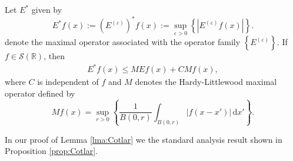 \documentclass[../dissertation.tex]{subfiles}
\begin{document}





\begin{lma}
	\label{lma:Cotlar}
	Let $E^*$ given by
	\[
		E^*f(x)
				:= \left( E^{(\varepsilon)} \right)^* f(x)
				:= \sup_{\varepsilon>0} \left\{\left|E^{(\varepsilon)} f(x)\right|\right\}.
	\]
	denote the maximal operator associated with the operator family 
	$\left\{ E^{(\varepsilon)}\right\}$. If $f \in \mathscr S(\mathbb R)$, then 
	\begin{align} \label{eq:Cotlar}
		E^* f(x) \leq M E f(x) + C M f(x),
	\end{align}
	where $C$ is independent of $f$ and $M$\label{sym:hardy} denotes the 
	Hardy-Littlewood maximal operator
	defined by 
	\[
        M f(x) 
        	= \sup_{r > 0} 
        		\left\{ 
        			\frac{1}{B(0, r)} \int_{B(0, r)} |f(x - x')| \, \mathrm{d}x' 
        		\right\}.
    \]	
\end{lma}



In our proof of Lemma \ref{lma:Cotlar} we the standard analysis result shown in Proposition \ref{prop:Cotlar}.
\end{document}
